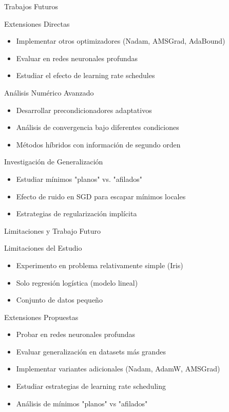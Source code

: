 \documentclass[10pt]{beamer}
\begin{document}
\begin{frame}{Trabajos Futuros}
\begin{block}{Extensiones Directas}
\begin{itemize}
\item Implementar otros optimizadores (Nadam, AMSGrad, AdaBound)
\item Evaluar en redes neuronales profundas
\item Estudiar el efecto de learning rate schedules
\end{itemize}
\end{block}

\begin{block}{Análisis Numérico Avanzado}
\begin{itemize}
\item Desarrollar precondicionadores adaptativos
\item Análisis de convergencia bajo diferentes condiciones
\item Métodos híbridos con información de segundo orden
\end{itemize}
\end{block}

\begin{block}{Investigación de Generalización}
\begin{itemize}
\item Estudiar mínimos "planos" vs. "afilados"
\item Efecto de ruido en SGD para escapar mínimos locales
\item Estrategias de regularización implícita
\end{itemize}
\end{block}
\end{frame}

\begin{frame}{Limitaciones y Trabajo Futuro}
\begin{block}{Limitaciones del Estudio}
\begin{itemize}
\item Experimento en problema relativamente simple (Iris)
\item Solo regresión logística (modelo lineal)
\item Conjunto de datos pequeño
\end{itemize}
\end{block}

\begin{block}{Extensiones Propuestas}
\begin{itemize}
\item Probar en redes neuronales profundas
\item Evaluar generalización en datasets más grandes
\item Implementar variantes adicionales (Nadam, AdamW, AMSGrad)
\item Estudiar estrategias de learning rate scheduling
\item Análisis de mínimos "planos" vs "afilados"
\end{itemize}
\end{block}
\end{frame}
\end{document}
